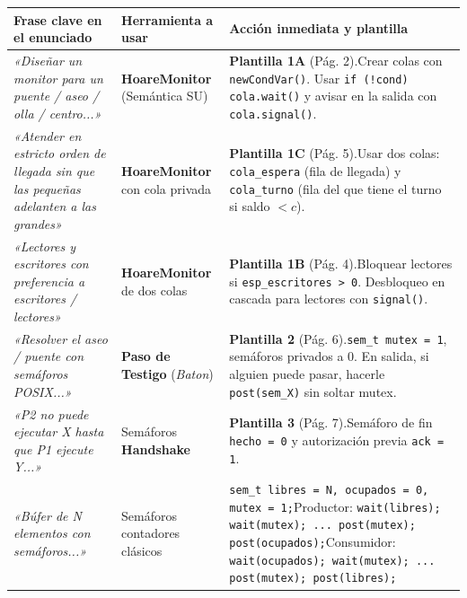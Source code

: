 \documentclass[11pt,a4paper]{article}
\begin{document}
\begin{table}[h!]
\centering\footnotesize
\renewcommand{\arraystretch}{1.2}
\begin{tabular}{p{4.6cm}p{3.2cm}p{7.5cm}}
\toprule
\textbf{Frase clave en el enunciado} & \textbf{Herramienta a usar} & \textbf{Acción inmediata y plantilla} \\
\midrule
\textit{«Diseñar un monitor para un puente / aseo / olla / centro...»} & \textbf{HoareMonitor} (Semántica SU) & \textbf{Plantilla 1A} (Pág. 2).\newline Crear colas con \texttt{newCondVar()}. Usar \texttt{if (!cond) cola.wait()} y avisar en la salida con \texttt{cola.signal()}. \\
\midrule
\textit{«Atender en estricto orden de llegada sin que las pequeñas adelanten a las grandes»} & \textbf{HoareMonitor} con cola privada & \textbf{Plantilla 1C} (Pág. 5).\newline Usar dos colas: \texttt{cola\_espera} (fila de llegada) y \texttt{cola\_turno} (fila del que tiene el turno si saldo $< c$). \\
\midrule
\textit{«Lectores y escritores con preferencia a escritores / lectores»} & \textbf{HoareMonitor} de dos colas & \textbf{Plantilla 1B} (Pág. 4).\newline Bloquear lectores si \texttt{esp\_escritores > 0}. Desbloqueo en cascada para lectores con \texttt{signal()}. \\
\midrule
\textit{«Resolver el aseo / puente con semáforos POSIX...»} & \textbf{Paso de Testigo} (\textit{Baton}) & \textbf{Plantilla 2} (Pág. 6).\newline \texttt{sem\_t mutex = 1}, semáforos privados a 0. En salida, si alguien puede pasar, hacerle \texttt{post(sem\_X)} sin soltar mutex. \\
\midrule
\textit{«P2 no puede ejecutar X hasta que P1 ejecute Y...»} & Semáforos \textbf{Handshake} & \textbf{Plantilla 3} (Pág. 7).\newline Semáforo de fin \texttt{hecho = 0} y autorización previa \texttt{ack = 1}. \\
\midrule
\textit{«Búfer de N elementos con semáforos...»} & Semáforos contadores clásicos & \texttt{sem\_t libres = N, ocupados = 0, mutex = 1;}\newline Productor: \texttt{wait(libres); wait(mutex); ... post(mutex); post(ocupados);}\newline Consumidor: \texttt{wait(ocupados); wait(mutex); ... post(mutex); post(libres);} \\
\bottomrule
\end{tabular}
\end{table}
\end{document}
